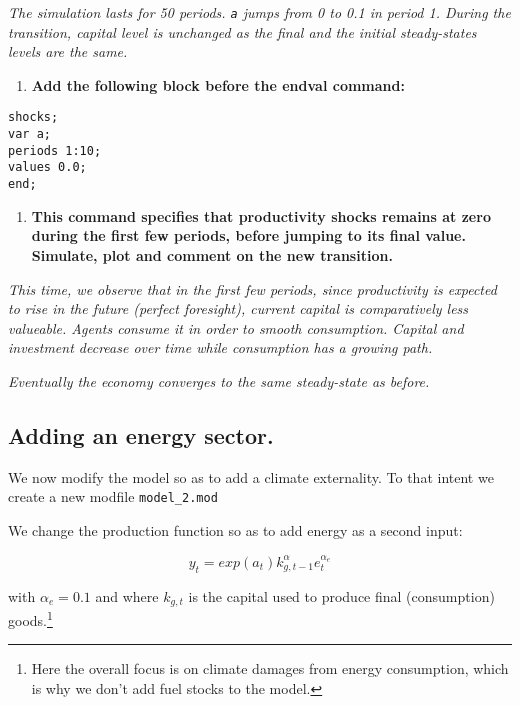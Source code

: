 \documentclass[
  letterpaper,
  DIV=11,
  numbers=noendperiod]{scrartcl}
\providecommand{\tightlist}{%
  \setlength{\itemsep}{0pt}\setlength{\parskip}{0pt}}\usepackage{longtable,booktabs,array}
\begin{document}
\emph{The simulation lasts for 50 periods. \texttt{a} jumps from 0 to
0.1 in period 1. During the transition, capital level is unchanged as
the final and the initial steady-states levels are the same.}

\begin{enumerate}
\def\labelenumi{\arabic{enumi}.}
\setcounter{enumi}{3}
\tightlist
\item
  \textbf{Add the following block before the endval command:}
\end{enumerate}

\begin{verbatim}
shocks;
var a;
periods 1:10;
values 0.0;
end;
\end{verbatim}

\begin{enumerate}
\def\labelenumi{\arabic{enumi}.}
\setcounter{enumi}{4}
\tightlist
\item
  \textbf{This command specifies that productivity shocks remains at
  zero during the first few periods, before jumping to its final value.
  Simulate, plot and comment on the new transition.}
\end{enumerate}

\emph{This time, we observe that in the first few periods, since
productivity is expected to rise in the future (perfect foresight),
current capital is comparatively less valueable. Agents consume it in
order to smooth consumption. Capital and investment decrease over time
while consumption has a growing path.}

\emph{Eventually the economy converges to the same steady-state as
before.}

\subsection{Adding an energy sector.}\label{adding-an-energy-sector.}

We now modify the model so as to add a climate externality. To that
intent we create a new modfile \texttt{model\_2.mod}

We change the production function so as to add energy as a second input:

\[y_t = exp(a_t) k_{g,t-1}^{\alpha}e_t^{\alpha_e}\]

with \(\alpha_e=0.1\) and where \(k_{g,t}\) is the capital used to
produce final (consumption) goods.\footnote{Here the overall focus is on
  climate damages from energy consumption, which is why we don't add
  fuel stocks to the model.}
\end{document}
